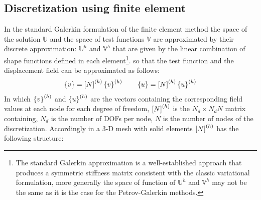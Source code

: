 \subsection{Discretization using finite element}\label{subsec1.1.2}
In the standard Galerkin formulation of the finite element method the space of the solution $\mathbb{U}$ and the space of test functions $\mathbb{V}$ are approximated by their discrete approximation: $\mathbb{U}^h$ and $\mathbb{V}^h$ that are given by the linear combination of shape functions defined in each element\footnote{The standard Galerkin approximation is a well-established approach that produces a symmetric stiffness matrix consistent with the classic variational formulation, more generally the space of function of $\mathbb{U}^h$ and $\mathbb{V}^h$ may not be the same as it is the case for the Petrov-Galerkin methods. }. so that the test function and the displacement field can be approximated as follows:
\begin{eqnarray}
\label{eq.1.11}
\left\lbrace{v}\right \rbrace=\left[{N}\right]^{(h)}\left\lbrace{v}\right \rbrace^{(h)} \qquad
\left\lbrace{u}\right \rbrace=\left[{N}\right]^{(h)}\left\lbrace{u}\right \rbrace^{(h)}
\end{eqnarray}
In which $\left\lbrace{v}\right \rbrace^{(h)}$ and $\left\lbrace{u}\right \rbrace^{(h)}$ are the vectors containing the corresponding field values at each node for each degree of freedom, $\left[{N}\right]^{(h)}$ is the $N_d \times N_dN$ matrix containing, $N_d$ is the number of DOFs per node, $N$ is the number of nodes of the discretization. Accordingly in a 3-D mesh with solid elements  $\left[{N}\right]^{(h)}$ has the following structure:

